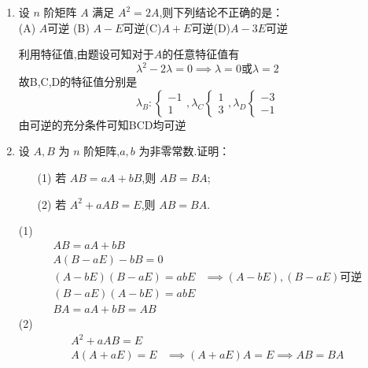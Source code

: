 \documentclass[12pt, a4paper, oneside, UTF8]{ctexbook}
\begin{document}
\begin{enumerate}
    \item 设 $ n $ 阶矩阵 $ A $ 满足 $ A^2 = 2A $,则下列结论不正确的是： \\
    (A) $A$可逆 \qquad (B) $A-E$可逆\qquad (C)$A+E$可逆\qquad (D)$A-3E$可逆 
    \begin{solution}
    利用特征值,由题设可知对于$A$的任意特征值有
    $$
        \lambda ^ 2 - 2\lambda = 0 \implies \lambda = 0 \text{或} \lambda = 2
    $$
    故B,C,D的特征值分别是  
    $$
        \lambda_B:\begin{cases}
            -1 \\
            1 
        \end{cases}, \lambda_C\begin{cases}
            1 \\
            3 
        \end{cases},\lambda_D\begin{cases}
            -3 \\
            -1
        \end{cases}
    $$
    由可逆的充分条件可知BCD均可逆
    \end{solution}
    
    \item 设 $ A, B $ 为 $ n $ 阶矩阵,$ a, b $ 为非零常数.证明：
    \begin{enumerate}
        \item[(1)] 若 $ AB = aA + bB $,则 $ AB = BA $;
        \item[(2)] 若 $ A^2 + aAB = E $,则 $ AB = BA $.
    \end{enumerate}
    
    \begin{solution}
    (1) 
    \begin{align*}
        AB = aA + bB& \\
        A(B-aE) - bB = 0& \\
        (A-bE)(B-aE)=abE &\implies (A-bE),(B-aE)\text{可逆} \\
        (B-aE)(A-bE)=abE& \\
        BA=aA+bB=AB&
    \end{align*}
    (2) 
    \begin{align*}
        A^2+aAB=E &\\
        A(A+aE)=E &\implies (A+aE)A = E \implies AB=BA
    \end{align*}
    \end{solution}
    

\end{enumerate}
\end{document}
